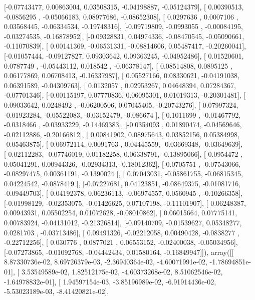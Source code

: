 \documentclass{article}
\begin{document}
       [-0.07743477,  0.00863004,  0.03508315, -0.04198887, -0.05124379],
       [ 0.00390513, -0.0856295 , -0.05066183,  0.08977686, -0.08652308],
       [ 0.0297636 ,  0.0007106 ,  0.03568445, -0.06334534, -0.19748316],
       [-0.09719809, -0.0993055 , -0.00084195, -0.03274535, -0.16878952],
       [-0.09328831,  0.04974336, -0.08470545, -0.05090661, -0.11070839],
       [ 0.00141369, -0.06531331, -0.08814606,  0.05487417, -0.20260041],
       [-0.01057444, -0.09127827,  0.09303642,  0.09363245, -0.04952486],
       [ 0.01520601,  0.0787749 , -0.05443112,  0.018542  , -0.06378147],
       [ 0.08514808,  0.0895125 ,  0.06177869,  0.06708413, -0.16337987],
       [ 0.05527166,  0.08330621, -0.04191038,  0.06391589, -0.04309763],
       [ 0.0132057 ,  0.02953267,  0.04648394,  0.07284367, -0.07701346],
       [-0.00115197,  0.07770836,  0.06095301,  0.01019313, -0.20301481],
       [ 0.09033642,  0.0248492 , -0.06200506,  0.07045405, -0.20743276],
       [ 0.07997324, -0.01923284, -0.05522083, -0.03152479, -0.086674  ],
       [ 0.1011699 , -0.01467792, -0.0318466 , -0.03933229, -0.14469383],
       [-0.0354093 ,  0.01890474, -0.04569646, -0.02112886, -0.20166812],
       [ 0.00841902,  0.08975643,  0.03852156,  0.05384998, -0.05463875],
       [-0.06972114,  0.0091763 ,  0.04445559, -0.03669348, -0.03649639],
       [-0.02112283, -0.07746019,  0.01182258,  0.06338791, -0.13895066],
       [ 0.0954472 ,  0.05041291,  0.00944326, -0.02934313, -0.18012362],
       [-0.0705751 , -0.07543066, -0.08297475,  0.00361191, -0.1390024 ],
       [ 0.07043031, -0.05861755, -0.06815345,  0.04224542, -0.0878419 ],
       [-0.07227681,  0.04123851, -0.08649375, -0.01081716, -0.09449703],
       [ 0.04192378,  0.06236113, -0.06974557,  0.0560945 , -0.10266358],
       [-0.01998129, -0.02353075, -0.01426625,  0.07107198, -0.11101907],
       [ 0.06248387,  0.00943931,  0.05502254,  0.01072628, -0.08010862],
       [ 0.06015664,  0.07775141,  0.00783924, -0.04131012, -0.21326814],
       [-0.09140709, -0.01539627,  0.05348277,  0.0281703 , -0.03713486],
       [ 0.09491326, -0.02212058,  0.00490428, -0.0838277 , -0.22712256],
       [ 0.030776  ,  0.0877021 ,  0.06553152, -0.02400038, -0.05034956],
       [-0.07273865, -0.01092768, -0.04442434,  0.01580164, -0.16849947]]), array([[  8.87330736e-02,   8.69726379e-03,  -2.36940364e-02,
         -4.60071991e-02,  -1.78694851e-01],
       [  3.53549589e-02,   1.82512175e-02,  -4.60373268e-02,
          8.51062546e-02,  -1.64978832e-01],
       [  1.94597154e-03,  -3.85196989e-02,  -6.91914436e-02,
         -5.53023189e-03,  -8.41420821e-02],
\end{document}
